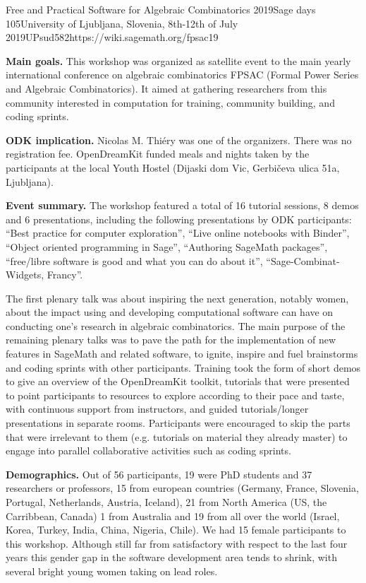 \begin{event}{Free and Practical Software for Algebraic Combinatorics 2019}{Sage days 105}{University of Ljubljana, Slovenia,
8th-12th of July 2019}{UPsud}{58}{2}{https://wiki.sagemath.org/fpsac19}

\textbf{Main goals.} This workshop was organized as satellite event to
the main yearly international conference on algebraic combinatorics
FPSAC (Formal Power Series and Algebraic Combinatorics). It aimed at
gathering researchers from this community interested in computation
for training, community building, and coding sprints.

\textbf{ODK implication.} Nicolas M. Thiéry  was one of the organizers.
There was no registration fee. OpenDreamKit funded meals and nights taken by the participants 
at the local Youth Hostel (Dijaski dom Vic, Gerbičeva ulica 51a, Ljubljana). 

\textbf{Event summary.} The workshop featured a total of 16 tutorial
sessions, 8 demos and 6 presentations, including the following
presentations by ODK participants: ``Best practice for computer
exploration'', ``Live online notebooks with Binder'', ``Object
oriented programming in Sage'', ``Authoring SageMath packages'',
``free/libre software is good and what you can do about it'',
``Sage-Combinat-Widgets, Francy''.

The first plenary talk was about inspiring the next generation,
notably women, about the impact using and developing computational
software can have on conducting one's research in algebraic
combinatorics. The main purpose of the remaining plenary talks was to
pave the path for the implementation of new features in SageMath and
related software, to ignite, inspire and fuel brainstorms and coding
sprints with other participants. Training took the form of short demos
to give an overview of the OpenDreamKit toolkit, tutorials that were
presented to point participants to resources to explore according to
their pace and taste, with continuous support from instructors, and
guided tutorials/longer presentations in separate rooms. Participants
were encouraged to skip the parts that were irrelevant to them (e.g.
tutorials on material they already master) to engage into parallel
collaborative activities such as coding sprints.

\textbf{Demographics.} Out of 56 participants, 19 were PhD students
and 37 researchers or professors, 15 from european countries 
(Germany, France, Slovenia, Portugal, Netherlands, Austria, Iceland), 21 from North America (US, the Carribbean, Canada) 
1 from Australia and 19 from all over the world (Israel, Korea, Turkey, India, China, Nigeria, Chile).
We had 15 female participants to this workshop. Although still far
from satisfactory with respect to the last four years
this gender gap in the software development area tends to shrink, with
several bright young women taking on lead roles.


\end{event}

